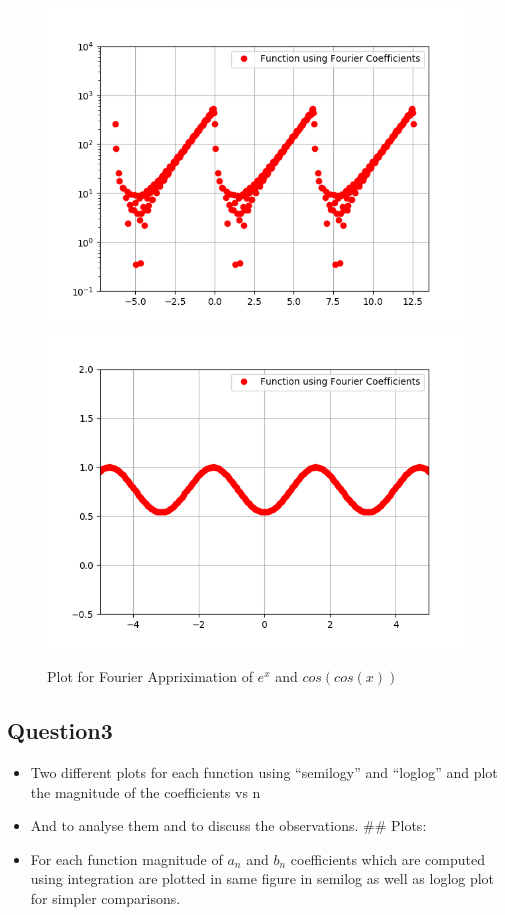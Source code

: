 \documentclass[11pt, a4paper]{article}
\begin{document}
     \begin{figure}[!tbh]
          \centering
          \includegraphics[scale=0.8]{./../Extras/3.png}  
          \includegraphics[scale=0.8]{./../Extras/4.png}  
          \caption{Plot for Fourier Appriximation of $e^x$ and $cos(cos(x))$}
     \end{figure}
     \break

    \subsection{Question3}\label{question3}

    \begin{itemize}
    \item
      Two different plots for each function using ``semilogy'' and
      ``loglog'' and plot the magnitude of the coefficients vs n
    \item
      And to analyse them and to discuss the observations. \#\# Plots:
    \item
      For each function magnitude of \(a_{n}\) and \(b_{n}\) coefficients
      which are computed using integration are plotted in same figure in
      semilog as well as loglog plot for simpler comparisons.
    \end{itemize}
\end{document}
